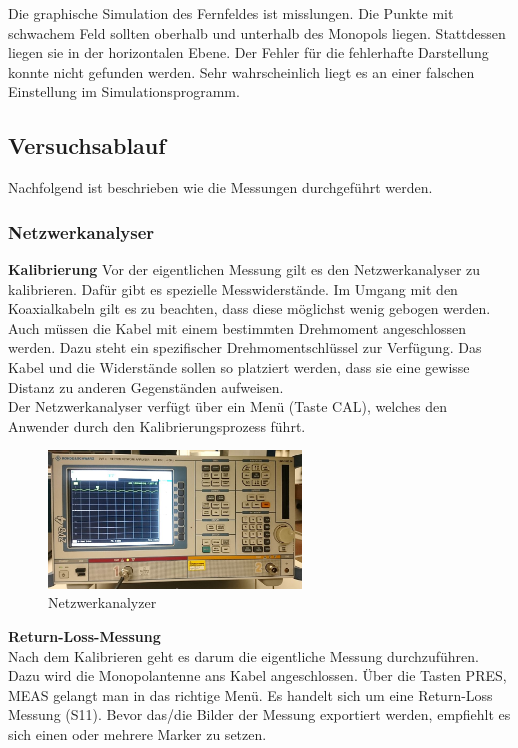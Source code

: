Die graphische Simulation des Fernfeldes ist misslungen. Die Punkte mit schwachem Feld sollten oberhalb und unterhalb des Monopols liegen. Stattdessen liegen sie in der horizontalen Ebene. Der Fehler für die fehlerhafte Darstellung konnte nicht gefunden werden. Sehr wahrscheinlich liegt es an einer falschen Einstellung im Simulationsprogramm.\\


\subsection{Versuchsablauf}
Nachfolgend ist beschrieben wie die Messungen durchgeführt werden.

\subsubsection{Netzwerkanalyser}
\textbf{Kalibrierung}
Vor der eigentlichen Messung gilt es den Netzwerkanalyser zu kalibrieren. Dafür gibt es spezielle Messwiderstände. Im Umgang mit den Koaxialkabeln gilt es zu beachten, dass diese möglichst wenig gebogen werden. Auch müssen die Kabel mit einem bestimmten Drehmoment angeschlossen werden. Dazu steht ein spezifischer Drehmomentschlüssel zur Verfügung. Das Kabel und die Widerstände sollen so platziert werden, dass sie eine gewisse Distanz zu anderen Gegenständen aufweisen.\\
Der Netzwerkanalyser verfügt über ein Menü (Taste CAL), welches den Anwender durch den Kalibrierungsprozess führt. \\
\vspace{3mm}

\begin{figure}[htbp]
	\centering
	\includegraphics[width=0.6\textwidth]{pic/Messungen/NWA.JPG}
	\caption{Netzwerkanalyzer}
	\label{fig:Netzwerkanalyzer}
\end{figure}

\textbf{Return-Loss-Messung}\\
Nach dem Kalibrieren geht es darum die eigentliche Messung durchzuführen. Dazu wird die Monopolantenne ans Kabel angeschlossen. Über die Tasten PRES, MEAS gelangt man in das richtige Menü. Es handelt sich um eine Return-Loss Messung (S11). Bevor das/die Bilder der Messung exportiert werden, empfiehlt es sich einen oder mehrere Marker zu setzen.


